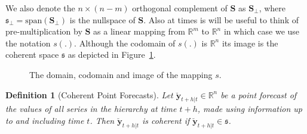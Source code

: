\documentclass[a4paper, 11pt]{article}
\newtheorem{definition}{Definition}[section]
\begin{document}
We also denote the $n\times(n-m)$ orthogonal complement of $\bm{S}$ as $\bm{S}_{\perp}$, where $\mathfrak{s}_\perp=\mbox{span}\left(\bm{S}_{\perp}\right)$ is the nullspace of $\bm{S}$. Also at times is  will be useful to think of pre-multiplication by $\bm{S}$ as a linear mapping from $\mathbb{R}^m$ to $\mathbb{R}^n$ in which case we use the notation $s(.)$.  Although the codomain of $s(.)$ is $\mathbb{R}^n$ its image is the coherent space $\mathfrak{s}$ as depicted in Figure~\ref{fig2}.

\begin{figure}[H]
  \begin{center}
    \newline
  \end{center}
  \caption{The domain, codomain and image of the mapping $s$.}\label{fig2}
\end{figure}

\begin{definition}[Coherent Point Forecasts]\label{def:cohpoint}
  Let $\breve{\bm{y}}_{t+h|t} \in \mathbb{R}^n$ be a point forecast of the values of all series in the hierarchy at time $t+h$,  made using information up to and including time $t$.  Then $\breve{\bm{y}}_{t+h|t}$ is \emph{coherent} if $\breve{\bm{y}}_{t+h|t} \in \mathfrak{s}$. 
\end{definition}
\end{document}
